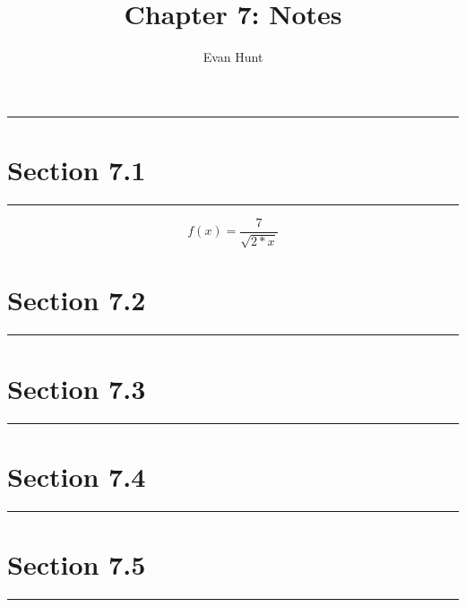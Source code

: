 \documentclass[12pt]{article}
\title{Chapter 7: Notes}
\author{Evan Hunt}
\begin{document}
    \maketitle

    \noindent\rule{\textwidth}{0.4pt}
    \section[]{Section 7.1}
    \noindent\rule{\textwidth}{0.4pt}
        \begin{equation}
            f(x) = \frac{7}{\sqrt{2*x}}
        \end{equation}
    \section[]{Section 7.2}
    \noindent\rule{\textwidth}{0.4pt}
    \section[]{Section 7.3}
    \noindent\rule{\textwidth}{0.4pt}
    \section[]{Section 7.4}
    \noindent\rule{\textwidth}{0.4pt}
    \section[]{Section 7.5}
    \noindent\rule{\textwidth}{0.4pt}
\end{document}
